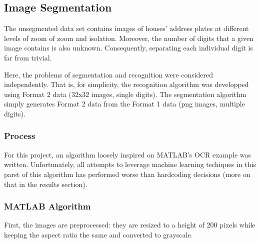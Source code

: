 \documentclass{article} %
\begin{document}
\subsection{Image Segmentation}
The unsegmented data set contains images of houses' address plates at different levels of zoom of zoom and isolation. Moreover, the number of digits that a given image contains is also unknown. Consequently, separating each individual digit is far from trivial.

Here, the problems of segmentation and recognition were considered independently. That is, for simplicity, the recognition algorithm was developped using Format 2 data (32x32 images, single digits). The segmentation algorithm simply generates Format 2 data from the Format 1 data (png images, multiple digits).

\subsubsection{Process}
For this project, an algorithm loosely inspired on MATLAB's OCR example\cite{automaticdetect} was written. Unfortunately, all attempts to leverage machine learning techiques in this parst of this algorithm has performed worse than hardcoding decisions (more on that in the results section).

\subsubsection{MATLAB Algorithm}
First, the images are preprocessed: they are resized to a height of 200 pixels while keeping the aspect ratio the same and converted to grayscale.
\end{document}
